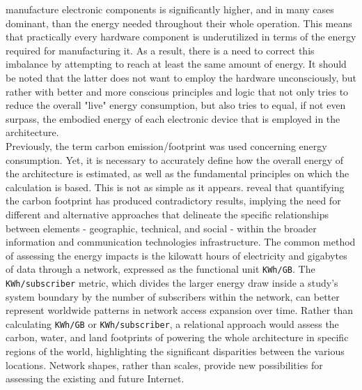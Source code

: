 manufacture electronic components is significantly higher, and in many cases dominant,
than the energy needed throughout their whole operation\cite{monster_footprint}.
This means that practically every hardware component is underutilized in terms
of the energy required for manufacturing it. As a result, there is a need to
correct this imbalance by attempting to reach at least the same amount of energy.
It should be noted that the latter does not want to employ the hardware unconsciously,
but rather with better and more conscious principles and logic that not only
tries to reduce the overall "live" energy consumption, but also tries to equal,
if not even surpass, the embodied energy of each electronic device that is employed
in the architecture. \\ %
Previously, the term carbon emission/footprint was used concerning energy
consumption. Yet, it is necessary to accurately define how the overall energy of
the architecture is estimated, as well as the fundamental principles on which the
calculation is based. This is not as simple as it appears. \cite{world_wide_web_carbon}
reveal that quantifying the carbon footprint has produced contradictory results,
implying the need for different and alternative approaches that delineate the
specific relationships between elements - geographic, technical, and social -
within the broader information and communication technologies infrastructure. The
common method of assessing the energy impacts is the kilowatt hours of electricity
and gigabytes of data through a network, expressed as the functional unit
\texttt{KWh/GB}. The \texttt{KWh/subscriber} metric, which divides the larger
energy draw inside a study's system boundary by the number of subscribers within
the network, can better represent worldwide patterns in network access expansion
over time. Rather than calculating \texttt{KWh/GB} or \texttt{KWh/subscriber}, a
relational approach would assess the carbon, water, and land footprints of powering
the whole architecture in specific regions of the world, highlighting the
significant disparities between the various locations. Network shapes, rather
than scales, provide new possibilities for assessing the existing and future Internet\cite{world_wide_web_carbon}.
\\ %

